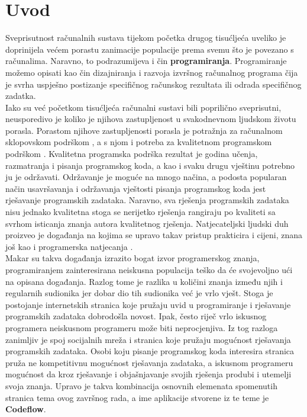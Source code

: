 \documentclass[times, utf8, zavrsni]{fer}
\begin{document}
	\chapter{Uvod}
	Sveprisutnost računalnih sustava tijekom početka drugog tisućljeća uveliko je doprinijela većem porastu zanimacije populacije prema svemu što je povezano s računalima.  Naravno, to podrazumijeva i čin \textbf{programiranja}. Programiranje možemo opisati kao čin dizajniranja i razvoja izvršnog računalnog programa čija je svrha uspješno postizanje specifičnog računskog rezultata ili odrada specifičnog zadatka.\\
	Iako su već početkom tisućljeća računalni sustavi bili poprilično sveprisutni, neusporedivo je koliko je njihova zastupljenost u svakodnevnom ljudskom životu porasla. Porastom njihove zastupljenosti porasla je potražnja za računalnom sklopovskom podrškom , a s njom i potreba za kvalitetnom programskom podrškom . Kvalitetna programska podrška rezultat je godina učenja, razmatranja i pisanja programskog koda, a kao i svaku drugu vještinu potrebno ju je održavati. Održavanje je moguće na mnogo načina, a podosta popularan način usavršavanja i održavanja vještosti pisanja programskog koda jest rješavanje programskih zadataka. Naravno, sva rješenja programskih zadataka nisu jednako kvalitetna stoga se nerijetko rješenja rangiraju po kvaliteti sa svrhom isticanja znanja autora kvalitetnog rješenja. Natjecateljski ljudski duh proizveo je događanja na kojima se upravo takav pristup prakticira i cijeni, znana još kao i programerska natjecanja .\\
	Makar su takva događanja izrazito bogat izvor programerskog znanja, programiranjem zainteresirana neiskusna populacija teško da će svojevoljno ući na opisana događanja. Razlog tome je razlika u količini znanja između njih i regularnih sudionika jer dobar dio tih sudionika već je vrlo vješt. Stoga je postojanje internetskih stranica koje pružaju uvid u programiranje i rješavanje programskih zadataka dobrodošla novost. Ipak, često riječ vrlo iskusnog programera neiskusnom programeru može biti neprocjenjiva. Iz tog razloga zanimljiv je spoj socijalnih mreža  i stranica koje pružaju mogućnost rješavanja programskih zadataka. Osobi koju pisanje programskog koda interesira stranica pruža ne kompetitivnu mogućnost rješavanja zadataka, a iskusnom programeru mogućnost da kroz rješavanje i objašnjavanje svojih rješenja produbi i utemelji svoja znanja. Upravo je takva kombinacija osnovnih elemenata spomenutih stranica tema ovog završnog rada, a ime aplikacije stvorene iz te teme je \textbf{Codeflow}.
	
\end{document}
